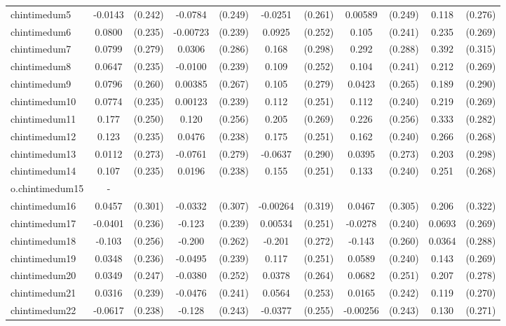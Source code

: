 \documentclass[]{article}
\begin{document}
\begin{tabular}{lcccccccccc}
chintimedum5 & -0.0143 & (0.242) & -0.0784 & (0.249) & -0.0251 & (0.261) & 0.00589 & (0.249) & 0.118 & (0.276) \\
chintimedum6 & 0.0800 & (0.235) & -0.00723 & (0.239) & 0.0925 & (0.252) & 0.105 & (0.241) & 0.235 & (0.269) \\
chintimedum7 & 0.0799 & (0.279) & 0.0306 & (0.286) & 0.168 & (0.298) & 0.292 & (0.288) & 0.392 & (0.315) \\
chintimedum8 & 0.0647 & (0.235) & -0.0100 & (0.239) & 0.109 & (0.252) & 0.104 & (0.241) & 0.212 & (0.269) \\
chintimedum9 & 0.0796 & (0.260) & 0.00385 & (0.267) & 0.105 & (0.279) & 0.0423 & (0.265) & 0.189 & (0.290) \\
chintimedum10 & 0.0774 & (0.235) & 0.00123 & (0.239) & 0.112 & (0.251) & 0.112 & (0.240) & 0.219 & (0.269) \\
chintimedum11 & 0.177 & (0.250) & 0.120 & (0.256) & 0.205 & (0.269) & 0.226 & (0.256) & 0.333 & (0.282) \\
chintimedum12 & 0.123 & (0.235) & 0.0476 & (0.238) & 0.175 & (0.251) & 0.162 & (0.240) & 0.266 & (0.268) \\
chintimedum13 & 0.0112 & (0.273) & -0.0761 & (0.279) & -0.0637 & (0.290) & 0.0395 & (0.273) & 0.203 & (0.298) \\
chintimedum14 & 0.107 & (0.235) & 0.0196 & (0.238) & 0.155 & (0.251) & 0.133 & (0.240) & 0.251 & (0.268) \\
o.chintimedum15 & - &  &  &  &  &  &  &  &  &  \\
chintimedum16 & 0.0457 & (0.301) & -0.0332 & (0.307) & -0.00264 & (0.319) & 0.0467 & (0.305) & 0.206 & (0.322) \\
chintimedum17 & -0.0401 & (0.236) & -0.123 & (0.239) & 0.00534 & (0.251) & -0.0278 & (0.240) & 0.0693 & (0.269) \\
chintimedum18 & -0.103 & (0.256) & -0.200 & (0.262) & -0.201 & (0.272) & -0.143 & (0.260) & 0.0364 & (0.288) \\
chintimedum19 & 0.0348 & (0.236) & -0.0495 & (0.239) & 0.117 & (0.251) & 0.0589 & (0.240) & 0.143 & (0.269) \\
chintimedum20 & 0.0349 & (0.247) & -0.0380 & (0.252) & 0.0378 & (0.264) & 0.0682 & (0.251) & 0.207 & (0.278) \\
chintimedum21 & 0.0316 & (0.239) & -0.0476 & (0.241) & 0.0564 & (0.253) & 0.0165 & (0.242) & 0.119 & (0.270) \\
chintimedum22 & -0.0617 & (0.238) & -0.128 & (0.243) & -0.0377 & (0.255) & -0.00256 & (0.243) & 0.130 & (0.271) \\

\end{tabular}
\end{document}
